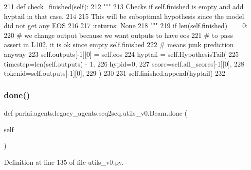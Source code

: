 \begin{DoxyCode}
211     \textcolor{keyword}{def }check\_finished(self):
212         \textcolor{stringliteral}{"""}
213 \textcolor{stringliteral}{        Checks if self.finished is empty and add hyptail in that case.}
214 \textcolor{stringliteral}{}
215 \textcolor{stringliteral}{        This will be suboptimal hypothesis since the model did not get any EOS}
216 \textcolor{stringliteral}{}
217 \textcolor{stringliteral}{        :returns: None}
218 \textcolor{stringliteral}{        """}
219         \textcolor{keywordflow}{if} len(self.finished) == 0:
220             \textcolor{comment}{# we change output because we want outputs to have eos}
221             \textcolor{comment}{# to pass assert in L102, it is ok since empty self.finished}
222             \textcolor{comment}{# means junk prediction anyway}
223             self.outputs[-1][0] = self.eos
224             hyptail = self.HypothesisTail(
225                 timestep=len(self.outputs) - 1,
226                 hypid=0,
227                 score=self.all\_scores[-1][0],
228                 tokenid=self.outputs[-1][0],
229             )
230 
231             self.finished.append(hyptail)
232 
\end{DoxyCode}
\mbox{\label{classparlai_1_1agents_1_1legacy__agents_1_1seq2seq_1_1utils__v0_1_1Beam_ac37b26314438d9e94b03e5a45efaf5dd}} 
\subsubsection{\texorpdfstring{done()}{done()}}
{\footnotesize\ttfamily def parlai.\+agents.\+legacy\+\_\+agents.\+seq2seq.\+utils\+\_\+v0.\+Beam.\+done (\begin{DoxyParamCaption}\item[{}]{self }\end{DoxyParamCaption})}



Definition at line 135 of file utils\+\_\+v0.\+py.


